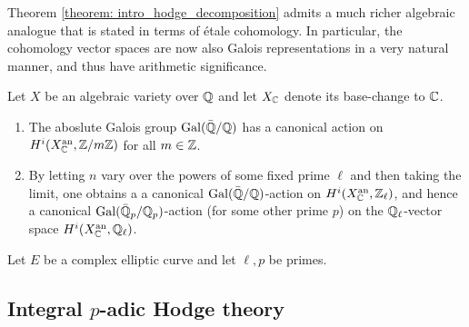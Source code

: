             Theorem \ref{theorem: intro_hodge_decomposition} admits a much richer algebraic analogue that is stated in terms of \'etale cohomology. In particular, the cohomology vector spaces are now also Galois representations in a very natural manner, and thus have arithmetic significance.
            \begin{theorem}
                Let $X$ be an algebraic variety over $\mathbb{Q}$ and let $X_{\mathbb{C}}$ denote its base-change to $\mathbb{C}$. 
                    \begin{enumerate}
                        \item The aboslute Galois group $\mathrm{Gal}(\bar{\mathbb{Q}}/\mathbb{Q})$ has a canonical action on $H^i(X_{\mathbb{C}}^{\mathrm{an}}, \mathbb{Z}/m\mathbb{Z})$ for all $m \in \mathbb{Z}$. 
                        \item By letting $n$ vary over the powers of some fixed prime $\ell$ and then taking the limit, one obtains a a canonical $\mathrm{Gal}(\bar{\mathbb{Q}}/\mathbb{Q})$-action on $H^i(X_{\mathbb{C}}^{\mathrm{an}}, \mathbb{Z}_{\ell})$, and hence a canonical $\mathrm{Gal}(\bar{\mathbb{Q}}_p/\mathbb{Q}_p)$-action (for some other prime $p$) on the $\mathbb{Q}_{\ell}$-vector space $H^i(X_{\mathbb{C}}^{\mathrm{an}}, \mathbb{Q}_{\ell})$.
                    \end{enumerate}
            \end{theorem} 
            \begin{example} 
                Let $E$ be a complex elliptic curve and let $\ell, p$ be primes.
            \end{example}
        
        \subsection{Integral \texorpdfstring{$p$}{}-adic Hodge theory}